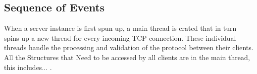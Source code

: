 \documentclass[11pt,a4paper]{article}
\begin{document}
		\subsection{Sequence of Events}
		When a server instance is first spun up, a main thread is crated that in turn spins up a new thread for every incoming TCP connection. These individual threads handle the processing and validation of the protocol between their clients. All the Structures that Need to be accessed by all clients are in the main thread, this includes... . 
		\subsection{}
		\subsection{}
\end{document}
